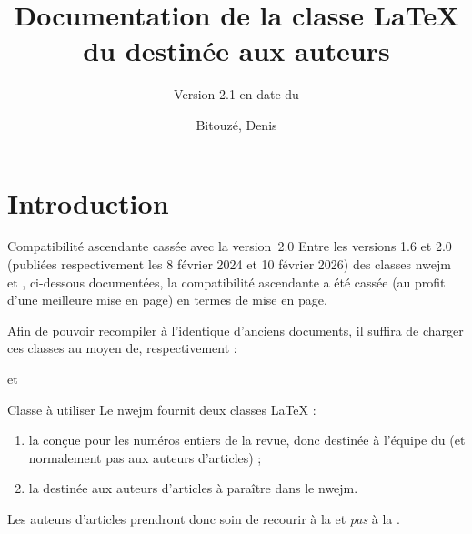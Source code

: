 \documentclass[french,nolocaltoc]{nwejmart}
\newcommand{\releaseversion}{2.1}
\newtheorem[style=definition]{fait}
\newtheorem[title=contraventionnalisation]{ctrv}
\newtheorem[title-plural=anneaux]{anneau}
\newtheorem[title-plural=idéaux]{idéal}
\begin{document}
\title[Documentation de la classe \LaTeX{} du
\texorpdfstring{\nwejm}{NWEJM}]{Documentation de la classe \LaTeX{} du \nwejm*{}
  destinée aux auteurs}%
%
\subtitle[Version \releaseversion{} (\DTMusedate{release-date})]{\small Version \releaseversion{} en
  date du }%
%
\author[%
affiliation={%
  Université du Littoral Côte d'Opale, Laboratoire de mathématiques pures et
  appliquées (\nolinkurl{denis.bitouze@univ-littoral.fr})%
},%
]{Bitouzé, Denis}
%
\maketitle
%
\etocarticlestylenomarks
\localtableofcontents
%

\section{Introduction}
\label{sec-introduction}

\begin{dbwarning}{Compatibilité ascendante cassée avec la version~2.0}{}
  Entre les versions 1.6 et 2.0 (publiées respectivement les 8 février 2024 et
  10 février 2026) des classes \textsf{nwejm} et \nwejmauthor{}, ci-dessous
  documentées, la compatibilité ascendante a été cassée (au profit d'une
  meilleure mise en page) en termes de mise en page.

  Afin de pouvoir recompiler à l'identique d'anciens documents, il suffira de
  charger ces classes au moyen de, respectivement :
  et
\end{dbwarning}

\begin{dbwarning}{Classe à utiliser}{}
  Le \gls{nwejm} fournit deux classes \LaTeX{} :
  \begin{enumerate}
  \item la \nwejmcl{} conçue pour les numéros entiers de la revue, donc destinée
    à l'équipe du \nwejm{} (et normalement pas aux auteurs d'articles) ;
  \item la \nwejmauthorcl{} destinée aux auteurs d'articles à paraître dans le
    \gls{nwejm}.
  \end{enumerate}
  Les auteurs d'articles prendront donc soin de recourir à la \nwejmauthorcl{}
  et \emph{pas} à la \nwejmcl{}.
\end{dbwarning}
\end{document}

